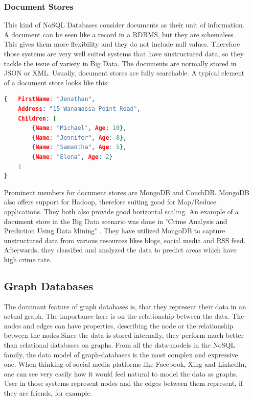 \documentclass{acm_proc_article-sp}
\begin{document}
\subsubsection{Document Stores}

This kind of NoSQL Databases consider documents as their unit of information. A
document can be seen like a record in a RDBMS, but they are schemaless. This
gives them more flexibility and they do not include null values. Therefore those systems are very well suited systems that have unstructured data, so they tackle the issue of variety in Big Data.
The documents are normally stored in JSON or XML. Usually, document stores are fully searchable. A typical element of a document store looks
like this:

\begin{lstlisting}[language=json,firstnumber=1]
{	FirstName: "Jonathan",
	Address: "15 Wanamassa Point Road",
	Children: [
		{Name: "Michael", Age: 10},
		{Name: "Jennifer", Age: 8},
		{Name: "Samantha", Age: 5},
		{Name: "Elena", Age: 2}
	]
}
\end{lstlisting}

Prominent members for document stores are MongoDB and CouchDB. MongoDB also offers support for Hadoop, therefore suiting good for Map/Reduce applications. They both also provide good horizontal scaling.	
An example of a document store in the Big Data scenario was done in "Crime Analysis and Prediction Using Data Mining"\cite{crime} . They have utilized MongoDB to capture unstructured data from various resources likes blogs, social media and RSS feed. Afterwards, they classified and analyzed the data to predict areas which have high crime rate.

\subsection{Graph Databases}

The dominant feature of graph databases is, that they represent their data in an actual graph. The importance here is on the relationship between the data. The nodes and edges can have properties, describing the node or the relationship between the nodes.Since the data is stored internally, they perform much better than relational databases on graphs. From all the data-models in the NoSQL family, the data model of graph-databases is the most complex and expressive one.
When thinking of social media platforms like Facebook, Xing and LinkedIn, one can see very easily how it would feel natural to model the data as graphs. User in those systems represent nodes and the edges between them represent, if they are friends, for example.
\end{document}
